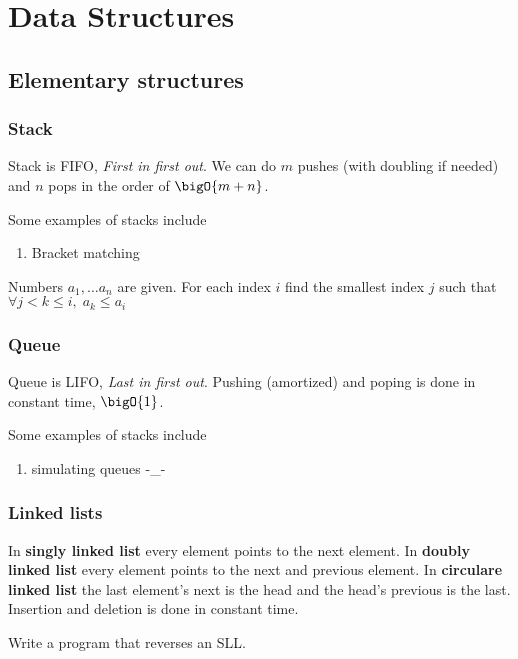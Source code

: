 \chapter{Data Structures}
\section{Elementary structures}
\subsection{Stack}
Stack is FIFO, \textit{First in first out}. We can do \(m\) pushes (with doubling if needed) and \(n\) pops in the order of \(\bigO{m + n}\).
\begin{example}
    Some examples of stacks include
    \begin{enumerate}
        \item Bracket matching
    \end{enumerate}
\end{example}

\begin{example}
    Numbers \(a_1 , \dots a_n\) are given. For each index \(i\) find the smallest index \(j\) such that \(\forall j < k \leq i, \; a_k \leq a_i\)
\end{example}

\subsection{Queue}
Queue is LIFO, \textit{Last in first out}.
Pushing (amortized) and poping is done in constant time, \(\bigO{1}\).
\begin{example}
    Some examples of stacks include
    \begin{enumerate}
        \item simulating queues -\_-
    \end{enumerate}
\end{example}

\subsection{Linked lists}
In \textbf{singly linked list} every element points to the next element. In \textbf{doubly linked list} every element points to the next and previous element. In \textbf{circulare linked list} the last element's next is the head and the head's previous is the last. Insertion and deletion is done in constant time.

\begin{example}
    Write a program that reverses an SLL.
\end{example}

